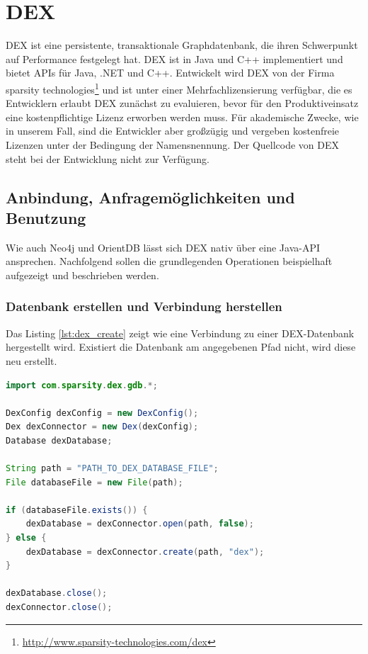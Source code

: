 \documentclass[11pt, a4paper, oneside]{article} %
\begin{document}
\section{DEX}
DEX ist eine persistente, transaktionale Graphdatenbank, die ihren Schwerpunkt auf Performance festgelegt hat. DEX ist in Java und C++ implementiert und bietet APIs für Java, .NET und C++. Entwickelt wird DEX von der Firma sparsity technologies\footnote{\url{http://www.sparsity-technologies.com/dex}} und ist unter einer Mehrfachlizensierung verfügbar, die es Entwicklern erlaubt DEX zunächst zu evaluieren, bevor für den Produktiveinsatz eine kostenpflichtige Lizenz erworben werden muss. Für akademische Zwecke, wie in unserem Fall, sind die Entwickler aber großzügig und vergeben kostenfreie Lizenzen unter der Bedingung der Namensnennung. Der Quellcode von DEX steht bei der Entwicklung nicht zur Verfügung.

\subsection{Anbindung, Anfragemöglichkeiten und Benutzung}
Wie auch Neo4j und OrientDB lässt sich DEX nativ über eine Java-API ansprechen. Nachfolgend sollen die grundlegenden Operationen beispielhaft aufgezeigt und beschrieben werden.

\subsubsection{Datenbank erstellen und Verbindung herstellen}
Das Listing \ref{lst:dex_create} zeigt wie eine Verbindung zu einer DEX-Datenbank hergestellt wird. Existiert die Datenbank am angegebenen Pfad nicht, wird diese neu erstellt.

\begin{lstlisting}[caption={DEX - Datenbank erstellen und Verbindung herstellen},label={lst:dex_create},language=Java]
import com.sparsity.dex.gdb.*;

DexConfig dexConfig = new DexConfig();
Dex dexConnector = new Dex(dexConfig);
Database dexDatabase;

String path = "PATH_TO_DEX_DATABASE_FILE";
File databaseFile = new File(path);

if (databaseFile.exists()) {
	dexDatabase = dexConnector.open(path, false);
} else {
	dexDatabase = dexConnector.create(path, "dex");
}

dexDatabase.close();
dexConnector.close();
\end{lstlisting}
\end{document}

